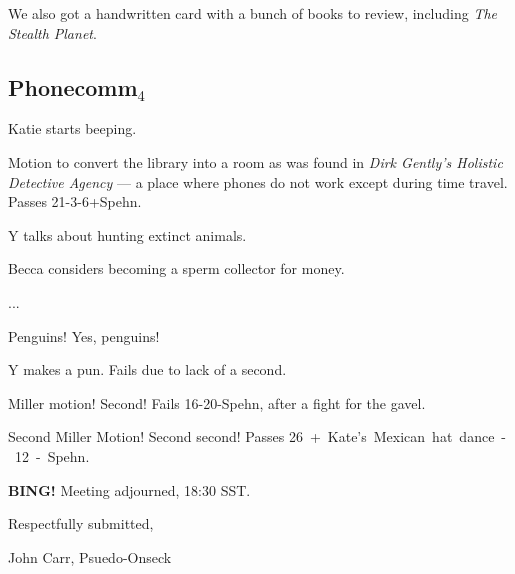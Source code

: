 \documentclass[10pt]{article}
\newcommand{\bing}{{\bf BING!} }
\newcommand{\goto}[1]{\bing \vskip 12pt \section*{{\em{#1}}}}
\begin{document}
We also got a handwritten card with a bunch of books to review,
including {\em The Stealth Planet}.

\subsection*{Phonecomm$_4$}
Katie starts beeping.

Motion to convert the library into a room as was found in
{\em Dirk Gently's Holistic Detective Agency} --- a place
where phones do not work except during time travel.
Passes \hbox{21-3-6+Spehn}.


Y talks about hunting extinct animals.

Becca considers becoming a sperm collector for money.

...


Penguins!  Yes, penguins!

Y makes a pun.  Fails due to lack of a second.

Miller motion!  Second!  Fails \hbox{16-20-Spehn}, after a fight for the gavel.

Second Miller Motion!  Second second!  Passes \hbox{26 + Kate's Mexican hat dance - 12 - Spehn}.


\bing
\noindent
Meeting adjourned, 18:30 SST.

\vspace{18pt}

\centerline{Respectfully submitted,}
\centerline{John Carr, Psuedo-Onseck}
\end{document}
